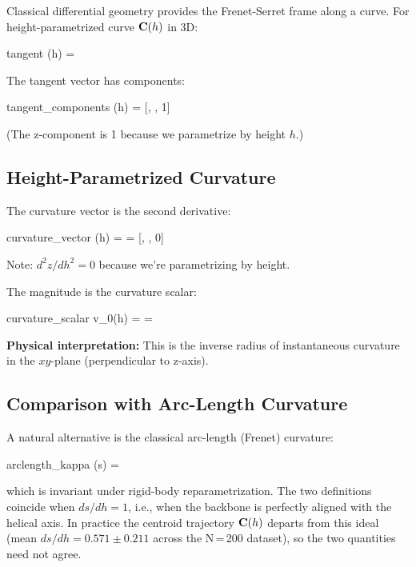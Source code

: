 Classical differential geometry provides the Frenet-Serret frame along a curve. For height-parametrized curve $\mathbf{C}(h)$ in 3D:

\begin{beq}{tangent}
    (h) = 
\end{beq}

The tangent vector has components:
\begin{beq}{tangent_components}
    (h) = [, , 1]
\end{beq}

(The z-component is 1 because we parametrize by height $h$.)

\subsection{Height-Parametrized Curvature}

The curvature vector is the second derivative:

\begin{beq}{curvature_vector}
    \vect{\kappa}(h) =  = [, , 0]
\end{beq}

Note: $d^2z/dh^2 = 0$ because we're parametrizing by height.

The magnitude is the curvature scalar:

\begin{beq}{curvature_scalar}
    v_0(h) =  = 
\end{beq}

\textbf{Physical interpretation:} This is the inverse radius of instantaneous curvature in the $xy$-plane (perpendicular to z-axis).

\subsection{Comparison with Arc-Length Curvature}

A natural alternative is the classical arc-length (Frenet) curvature:
\begin{beq}{arclength_kappa}
    \kappa(s) = 
\end{beq}
which is invariant under rigid-body reparametrization. The two definitions coincide when $ds/dh = 1$, i.e., when the backbone is perfectly aligned with the helical axis. In practice the centroid trajectory $\mathbf{C}(h)$ departs from this ideal (mean $ds/dh = 0.571 \pm 0.211$ across the N\,=\,200 dataset), so the two quantities need not agree.

